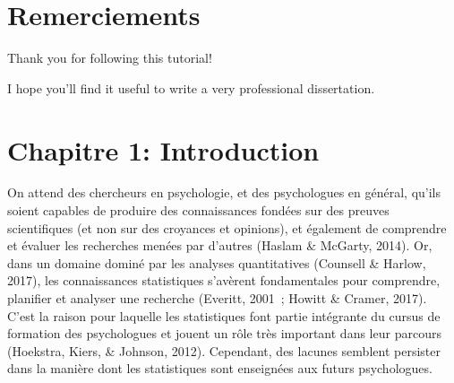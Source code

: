 \documentclass[
  12pt,
  french,
]{article}
\begin{document}
\newpage

\newpage

\tableofcontents
{}

\newpage

\section*{Remerciements}

Thank you for following this tutorial!

I hope you'll find it useful to write a very professional dissertation.

\newpage




\hypertarget{chapitre-1-introduction}{%
\section{Chapitre 1: Introduction}\label{chapitre-1-introduction}}

On attend des chercheurs en psychologie, et des psychologues en général,
qu'ils soient capables de produire des connaissances fondées sur des
preuves scientifiques (et non sur des croyances et opinions), et
également de comprendre et évaluer les recherches menées par d'autres
(Haslam \& McGarty, 2014). Or, dans un domaine dominé par les analyses
quantitatives
(Counsell \& Harlow, 2017), les connaissances statistiques s'avèrent
fondamentales pour comprendre, planifier et analyser une recherche
(Everitt, 2001~; Howitt \& Cramer, 2017). C'est la raison pour laquelle
les statistiques font partie intégrante du cursus de formation des
psychologues et jouent un rôle très important dans leur parcours
(Hoekstra, Kiers, \& Johnson, 2012). Cependant, des lacunes semblent
persister dans la manière dont les statistiques sont enseignées aux
futurs psychologues.
\end{document}
